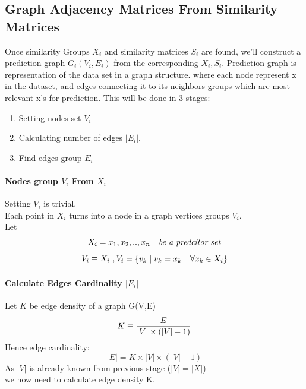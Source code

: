 \documentclass[a4paper]{article}
\begin{document}

\subsection{Graph Adjacency Matrices From Similarity Matrices }
Once similarity Groups $X_i$ and similarity matrices $S_i$ are found, we'll construct a prediction graph $G_i(V_i,E_i)$ from the corresponding $X_i,S_i$.
Prediction graph is representation of the data set in a graph structure.
where each node represent x in the dataset, and edges connecting it to its neighbors groups  which  are most relevant x's for prediction.
This will be done in 3 stages:
\begin{enumerate}
\item Setting nodes set $V_i$
\item Calculating number of edges $|E_i|$.
\item Find edges group $E_i$ 
\end{enumerate}
\paragraph{Nodes group $V_i$ From $X_i$} 
Setting $V_i$ is trivial.\\
Each point in $X_i$ turns into a node in a graph vertices groups $V_i$.
\\Let  
\begin{align*}
X_i={x_1,x_2,..,x_n} \emph{\quad be a predcitor set}
\end{align*}
\begin{equation}
V_i\equiv X_i \ ,V_i=\{ v_k\mid v_k= x_k\quad  \forall x_k\in X_i\}\\
\end{equation}


\paragraph{Calculate Edges Cardinality $|E_i|$} 
Let  $K$ be edge density of a graph G(V,E) \\
\begin{equation}
K\equiv\dfrac{|E|}{|V|\times (|V|-1)}\\
\end{equation}
Hence edge cardinality:
\begin{equation}
\left \vert{E}\right\vert=K\times |V|\times (|V|-1)
\end{equation}
As $|V| $ is already known from previous stage ($|V|=|X|$)\\
we now need to calculate  edge density K.
\end{document}
